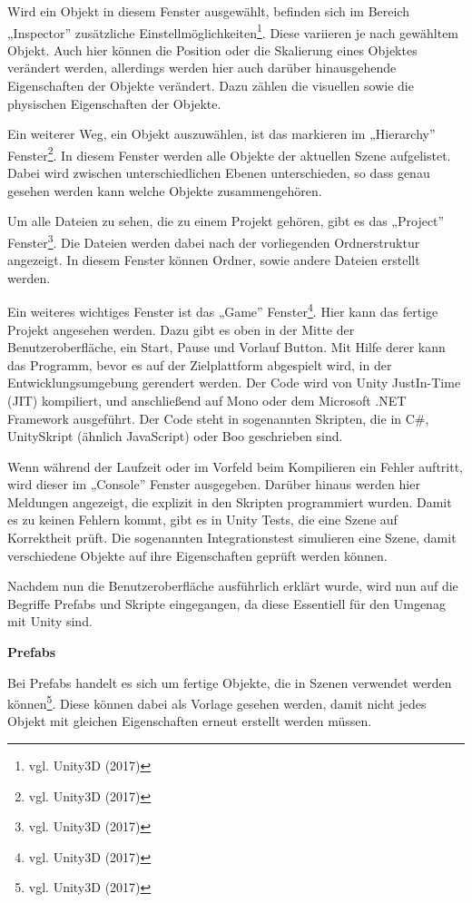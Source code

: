 Wird ein Objekt in diesem Fenster ausgewählt, befinden sich im Bereich „Inspector” zusätzliche Einstellmöglichkeiten\footnote{vgl. Unity3D \cite{unity3} (2017)}.
Diese variieren je nach gewähltem Objekt. Auch hier können die Position oder die Skalierung eines Objektes verändert werden, allerdings werden hier auch darüber hinausgehende Eigenschaften der Objekte verändert. Dazu zählen die visuellen sowie die physischen Eigenschaften der Objekte. 

Ein weiterer Weg, ein Objekt auszuwählen, ist das markieren im „Hierarchy” Fenster\footnote{vgl. Unity3D \cite{unity4} (2017)}. 
In diesem Fenster werden alle Objekte der aktuellen Szene aufgelistet. Dabei wird zwischen unterschiedlichen Ebenen unterschieden, so dass genau gesehen werden kann welche Objekte zusammengehören. 

Um alle Dateien zu sehen, die zu einem Projekt gehören, gibt es das „Project” Fenster\footnote{vgl. Unity3D \cite{unity5} (2017)}. Die Dateien werden dabei nach der vorliegenden Ordnerstruktur angezeigt. In diesem Fenster können Ordner, sowie andere Dateien erstellt werden.

Ein weiteres wichtiges Fenster ist das „Game” Fenster\footnote{vgl. Unity3D \cite{unity6} (2017)}. Hier kann das fertige Projekt angesehen werden. Dazu gibt es oben in der Mitte der Benutzeroberfläche, ein Start, Pause und Vorlauf Button. Mit Hilfe derer kann das Programm, bevor es auf der Zielplattform abgespielt wird, in der Entwicklungsumgebung gerendert werden. Der Code wird von Unity JustIn-Time (JIT) kompiliert, und anschließend auf Mono oder dem Microsoft .NET Framework ausgeführt. Der Code steht in sogenannten Skripten, die in C\#, UnitySkript (ähnlich JavaScript) oder Boo geschrieben sind.

Wenn während der Laufzeit oder im Vorfeld beim Kompilieren ein Fehler auftritt, wird dieser im „Console” Fenster ausgegeben. Darüber hinaus werden hier Meldungen angezeigt, die explizit in den Skripten programmiert wurden.
Damit es zu keinen Fehlern kommt, gibt es in Unity Tests, die eine Szene auf Korrektheit prüft. Die sogenannten Integrationstest simulieren eine Szene, damit verschiedene Objekte auf ihre Eigenschaften geprüft werden können. 

Nachdem nun die Benutzeroberfläche ausführlich erklärt wurde, wird nun auf die Begriffe Prefabs und Skripte eingegangen, da diese Essentiell für den Umgenag mit Unity sind.

\textbf{Prefabs}

Bei Prefabs handelt es sich um fertige Objekte, die in Szenen verwendet werden können\footnote{vgl. Unity3D \cite{unity7} (2017)}. Diese können dabei als Vorlage gesehen werden, damit nicht jedes Objekt mit gleichen Eigenschaften erneut erstellt werden müssen. 

